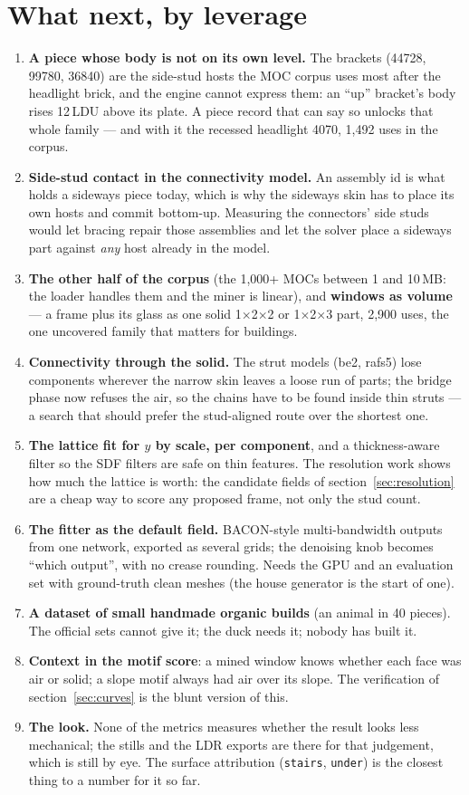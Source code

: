 \documentclass[10pt,a4paper]{article}
\newcommand{\code}[1]{\texttt{\small #1}}
\newcommand{\ldu}{\,LDU}
\begin{document}
\section{What next, by leverage}
\begin{enumerate}
\item \textbf{A piece whose body is not on its own level.} The brackets (44728, 99780, 36840) are the side-stud hosts the MOC
corpus uses most after the headlight brick, and the engine cannot express them: an ``up'' bracket's body rises 12\ldu{} above its
plate. A piece record that can say so unlocks that whole family --- and with it the recessed headlight 4070, 1,492 uses in the
corpus.
\item \textbf{Side-stud contact in the connectivity model.} An assembly id is what holds a sideways piece today, which is why the
sideways skin has to place its own hosts and commit bottom-up. Measuring the connectors' side studs would let bracing repair those
assemblies and let the solver place a sideways part against \emph{any} host already in the model.
\item \textbf{The other half of the corpus} (the 1,000+ MOCs between 1 and 10\,MB: the loader handles them and the miner is linear),
and \textbf{windows as volume} --- a frame plus its glass as one solid 1$\times$2$\times$2 or 1$\times$2$\times$3 part, 2,900 uses,
the one uncovered family that matters for buildings.
\item \textbf{Connectivity through the solid.} The strut models (be2, rafs5) lose components wherever the narrow skin leaves a
loose run of parts; the bridge phase now refuses the air, so the chains have to be found inside thin struts --- a search that should
prefer the stud-aligned route over the shortest one.
\item \textbf{The lattice fit for $y$ by scale, per component}, and a thickness-aware filter so the SDF filters are safe on thin
features. The resolution work shows how much the lattice is worth: the candidate fields of section~\ref{sec:resolution} are a
cheap way to score any proposed frame, not only the stud count.
\item \textbf{The fitter as the default field.} BACON-style multi-bandwidth outputs from one network, exported as several grids;
the denoising knob becomes ``which output'', with no crease rounding. Needs the GPU and an evaluation set with ground-truth clean
meshes (the house generator is the start of one).
\item \textbf{A dataset of small handmade organic builds} (an animal in 40 pieces). The official sets cannot give it; the duck
needs it; nobody has built it.
\item \textbf{Context in the motif score}: a mined window knows whether each face was air or solid; a slope motif always had air
over its slope. The verification of section~\ref{sec:curves} is the blunt version of this.
\item \textbf{The look.} None of the metrics measures whether the result looks less mechanical; the stills and the LDR exports are
there for that judgement, which is still by eye. The surface attribution (\code{stairs}, \code{under}) is the closest thing to a
number for it so far.
\end{enumerate}
\end{document}

